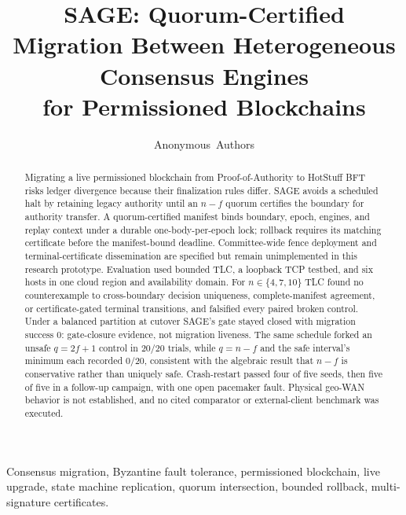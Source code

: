 \documentclass[journal]{IEEEtran}
\theoremstyle{definition}
\theoremstyle{remark}
\begin{document}
\title{SAGE: Quorum-Certified Migration Between Heterogeneous Consensus Engines\\for Permissioned Blockchains}

\author{Anonymous~Authors}


\maketitle

\begin{abstract}
Migrating a live permissioned blockchain from Proof-of-Authority to HotStuff BFT risks ledger
divergence because their finalization rules differ. SAGE avoids a scheduled halt by retaining legacy
authority until an $n-f$ quorum certifies the boundary for authority transfer. A quorum-certified
manifest binds boundary, epoch, engines, and replay context under a durable one-body-per-epoch lock;
rollback requires its matching certificate before the manifest-bound deadline. Committee-wide fence
deployment and terminal-certificate dissemination are specified but remain unimplemented in this
research prototype. Evaluation used bounded TLC, a loopback TCP testbed, and six hosts in one cloud
region and availability domain. For $n\in\{4,7,10\}$ TLC found no counterexample to cross-boundary
decision uniqueness, complete-manifest agreement, or certificate-gated terminal transitions, and
falsified every paired broken control. Under a balanced partition at cutover SAGE's gate
stayed closed with migration success $0$: gate-closure evidence, not migration liveness. The same
schedule forked an unsafe $q=2f{+}1$ control in $20/20$ trials, while $q=n-f$ and the safe interval's
minimum each recorded $0/20$, consistent with the algebraic result that $n-f$ is conservative rather
than uniquely safe. Crash-restart passed four of five seeds, then five of five in
a follow-up campaign, with one open pacemaker fault. Physical geo-WAN behavior is not established,
and no cited comparator or external-client benchmark was executed.
\end{abstract}

\begin{IEEEkeywords}
Consensus migration, Byzantine fault tolerance, permissioned blockchain, live upgrade,
state machine replication, quorum intersection, bounded rollback, multi-signature certificates.
\end{IEEEkeywords}
\end{document}
